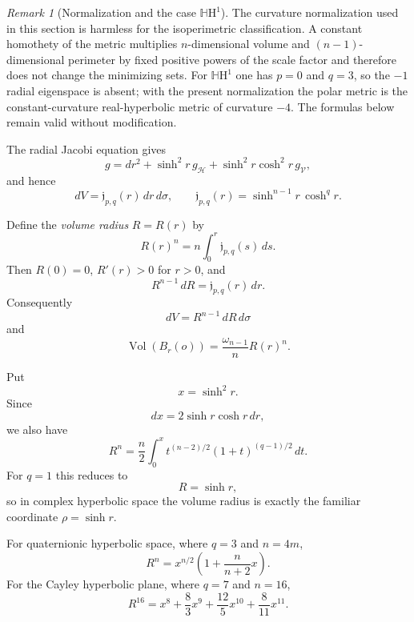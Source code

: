 \documentclass[11pt,reqno]{amsart}
\numberwithin{equation}{section}
\theoremstyle{definition}
\theoremstyle{remark}
\newtheorem{remark}[theorem]{Remark}
\newcommand{\HH}{\mathbb{H}\mathrm{H}}
\newcommand{\Vol}{\operatorname{Vol}}
\begin{document}
\begin{remark}[Normalization and the case $\HH^1$]
\label{rem:rank-one-normalization}
The curvature normalization used in this section is harmless for the
isoperimetric classification.  A constant homothety of the metric multiplies
$n$-dimensional volume and $(n-1)$-dimensional perimeter by fixed positive
powers of the scale factor and therefore does not change the minimizing sets.
For $\HH^1$ one has $p=0$ and $q=3$, so the $-1$ radial eigenspace is absent;
with the present normalization the polar metric is the constant-curvature
real-hyperbolic metric of curvature $-4$.  The formulas below remain valid
without modification.
\end{remark}

The radial Jacobi equation gives
\[
g
=
dr^2
+
\sinh^2r\,g_{\mathcal H}
+
\sinh^2r\cosh^2r\,g_{\mathcal V},
\]
and hence
\[
dV
=
\mathfrak j_{p,q}(r)\,dr\,d\sigma,
\qquad
\mathfrak j_{p,q}(r)
=
\sinh^{n-1}r\,\cosh^q r.
\]

Define the \emph{volume radius} $R=R(r)$ by
\begin{equation}
R(r)^n
=
n\int_0^r\mathfrak j_{p,q}(s)\,ds.
\label{eq:volume-radius-definition}
\end{equation}
Then $R(0)=0$, $R'(r)>0$ for $r>0$, and
\[
R^{n-1}\,dR
=
\mathfrak j_{p,q}(r)\,dr.
\]
Consequently
\[
dV=R^{n-1}\,dR\,d\sigma
\]
and
\[
\Vol(B_r(o))
=
\frac{\omega_{n-1}}{n}R(r)^n.
\]

Put
\[
x=\sinh^2r.
\]
Since
\[
dx=2\sinh r\cosh r\,dr,
\]
we also have
\[
R^n
=
\frac{n}{2}
\int_0^x
t^{(n-2)/2}(1+t)^{(q-1)/2}\,dt.
\]
For $q=1$ this reduces to
\begin{equation}
R=\sinh r,
\label{eq:complex-volume-radius-recovery}
\end{equation}
so in complex hyperbolic space the volume radius is exactly the familiar
coordinate $\rho=\sinh r$.

For quaternionic hyperbolic space, where $q=3$ and $n=4m$,
\begin{equation}
R^n
=
x^{n/2}
\left(1+\frac{n}{n+2}x\right).
\label{eq:quaternionic-volume-radius}
\end{equation}
For the Cayley hyperbolic plane, where $q=7$ and $n=16$,
\begin{equation}
R^{16}
=
x^8
+\frac{8}{3}x^9
+\frac{12}{5}x^{10}
+\frac{8}{11}x^{11}.
\label{eq:Cayley-volume-radius}
\end{equation}

\end{document}
